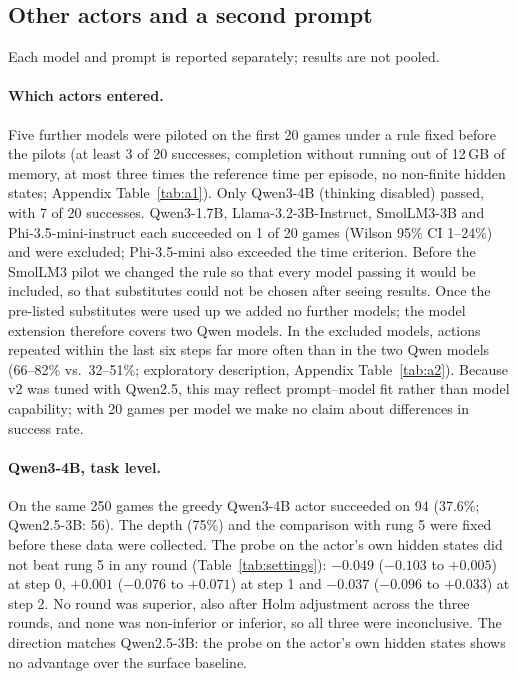 \documentclass[11pt]{article}
\begin{document}
\subsection{Other actors and a second prompt}\label{sec:actors}
Each model and prompt is reported separately; results are not pooled.

\paragraph{Which actors entered.} Five further models were piloted on the first 20 games under a rule fixed before the pilots
(at least 3 of 20 successes, completion without running out of 12\,GB of memory, at most three times the reference time per episode, no non-finite hidden states; Appendix Table~\ref{tab:a1}).
Only Qwen3-4B (thinking disabled) passed, with 7 of 20 successes. Qwen3-1.7B, Llama-3.2-3B-Instruct, SmolLM3-3B and Phi-3.5-mini-instruct each succeeded on 1 of 20 games
(Wilson 95\% CI 1--24\%) and were excluded; Phi-3.5-mini also exceeded the time criterion. Before the SmolLM3 pilot we changed the rule so that every model passing it would be included,
so that substitutes could not be chosen after seeing results. Once the pre-listed substitutes were used up we added no further models; the model extension therefore covers two Qwen models.
In the excluded models, actions repeated within the last six steps far more often than in the two Qwen models (66--82\% vs.\ 32--51\%; exploratory description, Appendix Table~\ref{tab:a2}).
Because v2 was tuned with Qwen2.5, this may reflect prompt--model fit rather than model capability; with 20 games per model we make no claim about differences in success rate.

\paragraph{Qwen3-4B, task level.} On the same 250 games the greedy Qwen3-4B actor succeeded on 94 (37.6\%; Qwen2.5-3B: 56).
The depth (75\%) and the comparison with rung 5 were fixed before these data were collected. The probe on the actor's own hidden states did not beat rung 5 in any round
(Table~\ref{tab:settings}): $-0.049$ ($-0.103$ to $+0.005$) at step 0, $+0.001$ ($-0.076$ to $+0.071$) at step 1 and $-0.037$ ($-0.096$ to $+0.033$) at step 2.
No round was superior, also after Holm adjustment across the three rounds, and none was non-inferior or inferior, so all three were inconclusive.
The direction matches Qwen2.5-3B: the probe on the actor's own hidden states shows no advantage over the surface baseline.
\end{document}
